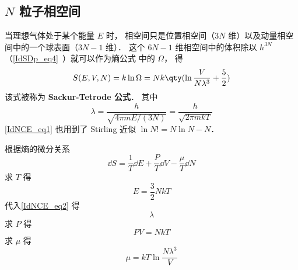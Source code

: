 
\begin{issues}
\issueDraft
\end{issues}

\subsection{$N$ 粒子相空间}

当理想气体处于某个能量 $E$ 时， 相空间只是位置相空间（$3N$ 维）以及动量相空间中的一个球表面（$3N-1$ 维）． 这个 $6N - 1$ 维相空间中的体积除以 $h^{3N}$ （\autoref{IdSDp_eq4}~）就可以作为熵公式%
中的 $\Omega$， 得
\begin{equation}\label{IdNCE_eq1}
S(E, V, N) = k\ln \Omega  = Nk \qty(\ln \frac{V}{N\lambda^3} + \frac52)
\end{equation}
该式被称为 \textbf{Sackur-Tetrode 公式}． 其中
\begin{equation}\label{IdNCE_eq2}
\lambda = \frac{h}{\sqrt{4\pi mE/(3N)}} = \frac{h}{\sqrt{2\pi mkT}}
\end{equation}
\autoref{IdNCE_eq1} 也用到了 Stirling 近似 %
$\ln N! = N\ln N - N$．

根据熵的微分关系 %
\begin{equation}
\dd{S} = \frac{1}{T} \dd{E} + \frac{P}{T} \dd{V} - \frac{\mu}{T} \dd{N}
\end{equation}
求 $T$ 得
\begin{equation}\label{IdNCE_eq3}
E = \frac{3}{2}NkT
\end{equation}
代入\autoref{IdNCE_eq2} 得
\begin{equation}
\lambda 
\end{equation}
求 $P$ 得
\begin{equation}
PV = NkT
\end{equation}
求 $\mu$ 得
\begin{equation}
\mu = kT \ln \frac{N\lambda^3}{V}
\end{equation}
